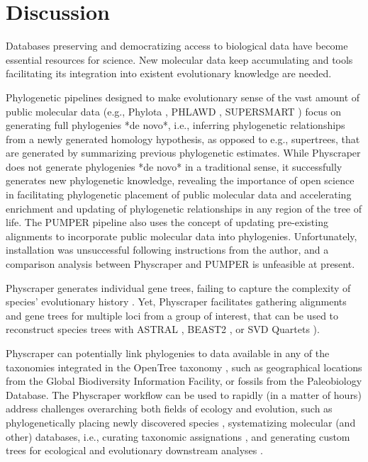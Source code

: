 \documentclass{bmcart}
\begin{document}
\section*{Discussion}

Databases preserving and democratizing access to biological data
have become essential resources for science.
New molecular data keep accumulating and tools facilitating its integration into
existent evolutionary knowledge are needed.

Phylogenetic pipelines designed to make evolutionary sense of the vast amount of
public molecular data (e.g., Phylota \cite{sanderson2008phylota},
PHLAWD \cite{smith2009mega},
SUPERSMART \cite{antonelli2017toward}) focus on generating full phylogenies *de novo*,
i.e., inferring phylogenetic relationships from a newly generated homology hypothesis,
as opposed to e.g., supertrees, that are generated by summarizing previous
phylogenetic estimates.
While Physcraper does not generate phylogenies *de novo* in a traditional sense,
it successfully generates new phylogenetic knowledge, revealing the importance of
open science in facilitating phylogenetic placement of public molecular data and
accelerating enrichment and updating of phylogenetic relationships in any region
of the tree of life.
The PUMPER pipeline \cite{izquierdo2014pumper} also uses the concept of updating
pre-existing alignments to incorporate public molecular data into phylogenies.
Unfortunately, installation was unsuccessful following instructions from the author,
and a comparison analysis between Physcraper and PUMPER is unfeasible at present.

Physcraper generates individual gene trees, failing to capture the complexity of
species' evolutionary history \cite{song2012resolving}. Yet, Physcraper facilitates
gathering alignments and gene trees for multiple loci from a group of interest,
that can be used to reconstruct species trees with ASTRAL \cite{mirarab2014astral},
BEAST2 \cite{bouckaert2019beast}, or SVD Quartets \cite{chifman2014quartet}).

Physcraper can potentially link phylogenies to data available in any of the
taxonomies integrated in the OpenTree taxonomy \cite{rees2017automated}, such as
geographical locations from the Global Biodiversity Information Facility, or
fossils from the Paleobiology Database.
The Physcraper workflow can be used to rapidly (in a matter of hours)
address challenges overarching both fields of ecology and evolution, such as
phylogenetically placing newly discovered species \cite{webb2010biodiversity},
systematizing molecular (and other) databases, i.e., curating taxonomic assignations
\cite{san2010molecular},
and generating custom trees for ecological \cite{helmus2012phylogenetic} and
evolutionary downstream analyses \cite{stoltzfus2013phylotastic}.
\end{document}
